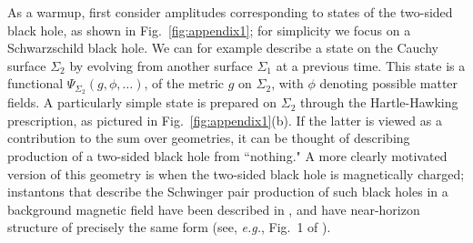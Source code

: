 \documentclass[11pt]{article}
\numberwithin{equation}{section}
\begin{document}
As a warmup, first consider amplitudes corresponding to states of the two-sided black hole, as shown in Fig.~\ref{fig:appendix1}; for simplicity we focus on a Schwarzschild black hole. We can for example  describe a state on the Cauchy surface $\Sigma_2$ by evolving from another surface $\Sigma_1$ at a previous time. This state is a functional $\Psi_{\Sigma_2}(g, \phi,\ldots)$, of the metric $g$ on $\Sigma_2$,  with $\phi$ denoting possible matter fields.  A particularly simple state is prepared on $\Sigma_2$ through the Hartle-Hawking prescription, as pictured in Fig.~\ref{fig:appendix1}(b).  If the latter is viewed as a contribution to the sum over geometries, it can be thought of describing production of a two-sided black hole from ``nothing."  A more clearly motivated version of this geometry is when the two-sided black hole is magnetically charged; instantons that describe the Schwinger pair production of such black holes in a background magnetic field have been described in \cite{Gibbons:1986cq,Garfinkle:1990eq,Garfinkle:1993xk}, and have near-horizon structure of precisely the same form (see, {\it e.g.}, Fig.~1 of \cite{Garfinkle:1993xk}).
\end{document}
